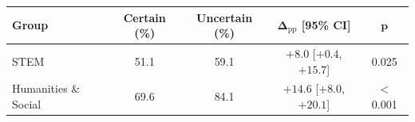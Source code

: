 \begin{tabular}{@{}lccc c@{}}
\toprule
\textbf{Group} & \textbf{Certain (\%)} & \textbf{Uncertain (\%)} & $\boldsymbol{\Delta}_{\mathrm{pp}}$ [95\% CI] & $\boldsymbol{p}$ \\
\midrule
STEM & 51.1 & 59.1 & $+8.0$ [$+0.4$, $+15.7$] & 0.025 \\
Humanities \& Social & 69.6 & 84.1 & $+14.6$ [$+8.0$, $+20.1$] & $<$0.001 \\
\bottomrule
\end{tabular}